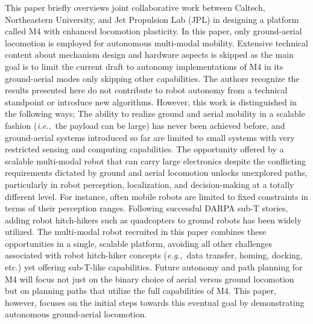 \documentclass[letterpaper, 10 pt, conference]{ieeeconf}  %
\newcommand{\eg}{\emph{e.g.},}
\newcommand{\ie}{\emph{i.e.},}
\begin{document}

This paper briefly overviews joint collaborative work between Caltech, Northeastern University, and Jet Propulsion Lab (JPL) in designing a platform called M4 with enhanced locomotion plasticity. In this paper, only ground-aerial locomotion is employed for autonomous multi-modal mobility. Extensive technical content about mechanism design and hardware aspects is skipped as the main goal is to limit the current draft to autonomy implementations of M4 in its ground-aerial modes only skipping other capabilities. The authors recognize the results presented here do not contribute to robot autonomy from a technical standpoint or introduce new algorithms. However, this work is distinguished in the following ways; 
%
{%
The ability to realize ground and aerial mobility in a scalable fashion (\ie~the payload can be large) has never been achieved before, and ground-aerial systems introduced so far are limited to small systems with very restricted sensing and computing capabilities. The opportunity offered by a scalable multi-modal robot that can carry large electronics despite the conflicting requirements dictated by ground and aerial locomotion unlocks unexplored paths, particularly in robot perception, localization, and decision-making at a totally different level. For instance, often mobile robots are limited to fixed constraints in terms of their perception ranges. Following successful DARPA sub-T stories, adding robot hitch-hikers such as quadcopters to ground robots has been widely utilized. The multi-modal robot recruited in this paper combines these opportunities in a single, scalable platform, avoiding all other challenges associated with robot hitch-hiker concepts (\eg~data transfer, homing, docking, etc.) yet offering sub-T-like capabilities. Future autonomy and path planning for M4 will focus not just on the binary choice of aerial versus ground locomotion but on planning paths that utilize the full capabilities of M4. This paper, however, focuses on the initial steps towards this eventual goal by demonstrating autonomous ground-aerial locomotion.}
\end{document}
